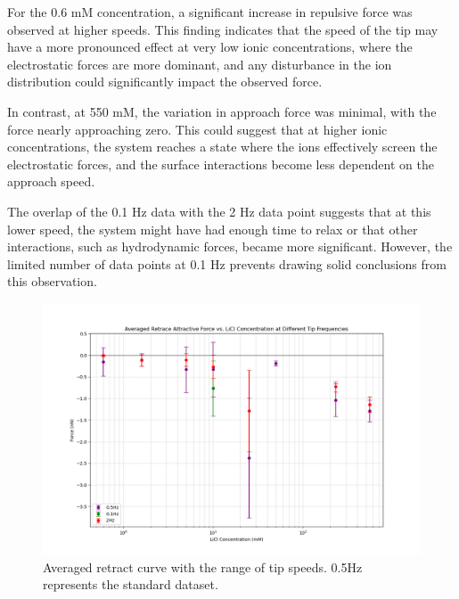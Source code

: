 For the 0.6 mM concentration, a significant increase in repulsive force was observed at higher speeds. This finding indicates that the speed of the tip may have a more pronounced effect at very low ionic concentrations, where the electrostatic forces are more dominant, and any disturbance in the ion distribution could significantly impact the observed force.

In contrast, at 550 mM, the variation in approach force was minimal, with the force nearly approaching zero. This could suggest that at higher ionic concentrations, the system reaches a state where the ions effectively screen the electrostatic forces, and the surface interactions become less dependent on the approach speed.

The overlap of the 0.1 Hz data with the 2 Hz data point suggests that at this lower speed, the system might have had enough time to relax or that other interactions, such as hydrodynamic forces, became more significant. However, the limited number of data points at 0.1 Hz prevents drawing solid conclusions from this observation.

\begin{figure}[h!]
\centering
\includegraphics[width=\textwidth]{chapter7/Tip speed/Overall graph retrace.png}
\caption{Averaged retract curve with the range of tip speeds. 0.5Hz represents the standard dataset.}
\label{fig:RetractAverageSpeed}
\end{figure}

